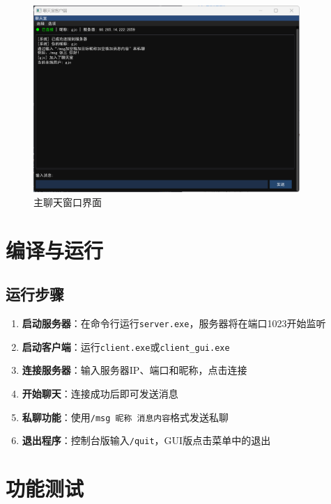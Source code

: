 \documentclass[12pt, a4paper]{article}
\newcommand{\cmd}[1]{\texttt{#1}}
\begin{document}
\begin{figure}[H]
   \centering
   \includegraphics[width=0.9\textwidth]{pic/chat_window.png}
   \caption{主聊天窗口界面}
   \label{fig:chat_window}
\end{figure}


\section{编译与运行}

\subsection{运行步骤}

\begin{enumerate}[itemsep=3pt]
  \item \textbf{启动服务器}：在命令行运行\cmd{server.exe}，服务器将在端口1023开始监听
  \item \textbf{启动客户端}：运行\cmd{client.exe}或\cmd{client\_gui.exe}
  \item \textbf{连接服务器}：输入服务器IP、端口和昵称，点击连接
  \item \textbf{开始聊天}：连接成功后即可发送消息
  \item \textbf{私聊功能}：使用\cmd{/msg 昵称 消息内容}格式发送私聊
  \item \textbf{退出程序}：控制台版输入\cmd{/quit}，GUI版点击菜单中的退出
\end{enumerate}



\section{功能测试}
\end{document}
